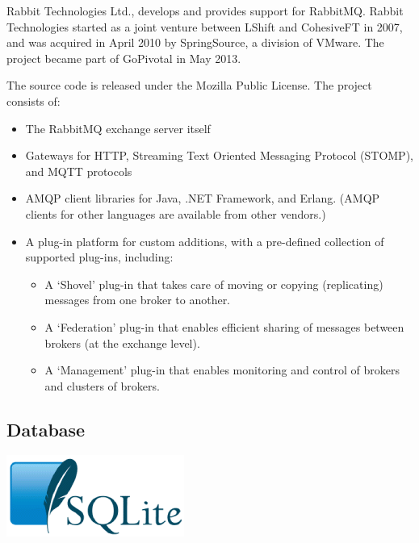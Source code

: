 \documentclass[12pt]{article}
\begin{document}
Rabbit Technologies Ltd., develops and provides support for RabbitMQ. Rabbit Technologies started as a joint venture between LShift and CohesiveFT in 2007, and was acquired in April 2010 by SpringSource, a division of VMware. The project became part of GoPivotal in May 2013.

The source code is released under the Mozilla Public License. The project consists of:
\begin{itemize}
    
    \item The RabbitMQ exchange server itself

    \item Gateways for HTTP, Streaming Text Oriented Messaging Protocol (STOMP), and MQTT protocols

    \item  AMQP client libraries for Java, .NET Framework, and Erlang. (AMQP clients for other languages are available from other vendors.)

    \item A plug-in platform for custom additions, with a pre-defined collection of supported plug-ins, including:

        \begin{itemize}
        
            \item A `Shovel' plug-in that takes care of moving or copying (replicating) messages from one broker to another.

            \item A `Federation' plug-in that enables efficient sharing of messages between brokers (at the exchange level).

            \item A `Management' plug-in that enables monitoring and control of brokers and clusters of brokers.~\cite{wiki:rabbitmq}

        \end{itemize}
\end{itemize}

\subsection{Database}

\includegraphics{images/sqlite.png} \\
\end{document}
